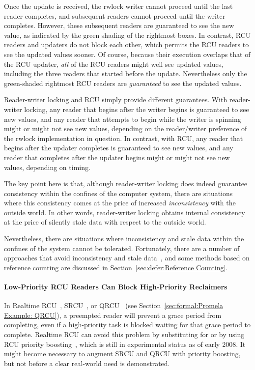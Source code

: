 Once the update is received, the rwlock writer cannot proceed until the
last reader completes, and subsequent readers cannot proceed until the
writer completes.
However, these subsequent readers are guaranteed to see the new value,
as indicated by the green shading of the rightmost boxes.
In contrast, RCU readers and updaters do not block each other, which permits
the RCU readers to see the updated values sooner.
Of course, because their execution overlaps that of the RCU updater,
\emph{all} of the RCU readers might well see updated values, including
the three readers that started before the update.
Nevertheless only the green-shaded rightmost RCU readers
are \emph{guaranteed} to see the updated values.

Reader-writer locking and RCU simply provide different guarantees.
With reader-writer locking, any reader that begins after the writer begins
is guaranteed to see new values, and any reader that attempts to
begin while the writer is spinning might or might not see new values,
depending on the reader/writer preference of the rwlock implementation in
question.
In contrast, with RCU, any reader that begins after the updater completes
is guaranteed to see new values, and any reader that completes after the
updater begins might or might not see new values, depending on timing.

The key point here is that, although reader-writer locking does
indeed guarantee consistency within the confines of the computer system,
there are situations where this consistency comes at the price of
increased \emph{inconsistency} with the outside world.
In other words, reader-writer locking obtains internal consistency at the
price of silently stale data with respect to the outside world.

Nevertheless, there are situations where inconsistency and stale
data within the confines of the system cannot be tolerated.
Fortunately,
there are a number of approaches that avoid inconsistency and stale
data~\cite{PaulEdwardMcKenneyPhD,Arcangeli03}, and some
methods based on reference counting are discussed in
Section~\ref{sec:defer:Reference Counting}.

\paragraph{Low-Priority RCU Readers Can Block High-Priority Reclaimers}

In Realtime RCU~\cite{DinakarGuniguntala2008IBMSysJ},
SRCU~\cite{PaulEMcKenney2006c}, or
QRCU~\cite{PaulEMcKenney2007QRCUspin} (see
Section~\ref{sec:formal:Promela Example: QRCU}),
a preempted reader will prevent
a grace period from completing, even if a high-priority task is
blocked waiting for that grace period to complete.
Realtime RCU can avoid this problem by substituting 
for  or by using RCU priority
boosting~\cite{PaulEMcKenney2007BoostRCU,DinakarGuniguntala2008IBMSysJ},
which is still in experimental status as of early 2008.
It might become necessary to augment SRCU and QRCU with priority boosting,
but not before a clear real-world need is demonstrated.

